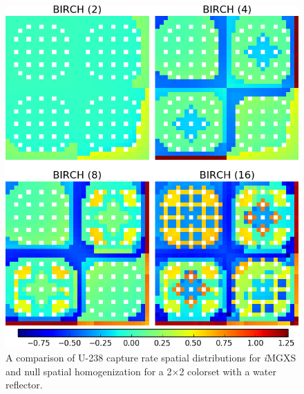 \begin{figure}[h!]
\centering
\includegraphics[width=0.9\linewidth]{figures/results/compare/reflector/compare-capt}
\vspace{2mm}
\caption[U-238 capture rate comparison for a 2$\times$2 colorset with reflector]{A comparison of U-238 capture rate spatial distributions for \textit{i}\ac{MGXS} and null spatial homogenization for a 2$\times$2 colorset with a water reflector.}
\label{fig:chap11-assm-refl-capt-rates-comp}
\end{figure}

\clearpage

